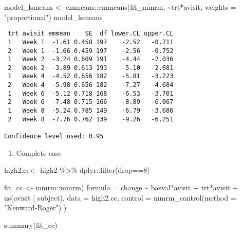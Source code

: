 \documentclass[
  letterpaper,
  DIV=11,
  numbers=noendperiod]{scrreprt}
\newenvironment{Shaded}{\begin{snugshade}}{\end{snugshade}}
\newcommand{\AttributeTok}[1]{\textcolor[rgb]{0.40,0.45,0.13}{#1}}
\newcommand{\DecValTok}[1]{\textcolor[rgb]{0.68,0.00,0.00}{#1}}
\newcommand{\FunctionTok}[1]{\textcolor[rgb]{0.28,0.35,0.67}{#1}}
\newcommand{\NormalTok}[1]{\textcolor[rgb]{0.00,0.23,0.31}{#1}}
\newcommand{\OtherTok}[1]{\textcolor[rgb]{0.00,0.23,0.31}{#1}}
\newcommand{\SpecialCharTok}[1]{\textcolor[rgb]{0.37,0.37,0.37}{#1}}
\newcommand{\StringTok}[1]{\textcolor[rgb]{0.13,0.47,0.30}{#1}}
\providecommand{\tightlist}{%
  \setlength{\itemsep}{0pt}\setlength{\parskip}{0pt}}\usepackage{longtable,booktabs,array}
\begin{document}
\begin{Shaded}
\begin{Highlighting}[]
\NormalTok{model\_lsmeans }\OtherTok{\textless{}{-}}\NormalTok{ emmeans}\SpecialCharTok{::}\FunctionTok{emmeans}\NormalTok{(fit\_mmrm, }\SpecialCharTok{\textasciitilde{}}\NormalTok{trt}\SpecialCharTok{*}\NormalTok{avisit, }\AttributeTok{weights =} \StringTok{"proportional"}\NormalTok{)}
\NormalTok{model\_lsmeans}
\end{Highlighting}
\end{Shaded}

\begin{verbatim}
 trt avisit emmean    SE  df lower.CL upper.CL
 1   Week 1  -1.61 0.458 197    -2.52   -0.711
 2   Week 1  -1.66 0.459 197    -2.56   -0.752
 1   Week 2  -3.24 0.609 191    -4.44   -2.036
 2   Week 2  -3.89 0.613 193    -5.10   -2.681
 1   Week 4  -4.52 0.656 182    -5.81   -3.223
 2   Week 4  -5.98 0.656 182    -7.27   -4.684
 1   Week 6  -5.12 0.718 168    -6.53   -3.701
 2   Week 6  -7.48 0.715 166    -8.89   -6.067
 1   Week 8  -5.24 0.785 149    -6.79   -3.686
 2   Week 8  -7.76 0.762 139    -9.26   -6.251

Confidence level used: 0.95 
\end{verbatim}

\begin{enumerate}
\def\labelenumi{\arabic{enumi}.}
\setcounter{enumi}{1}
\tightlist
\item
  Complete case
\end{enumerate}

\begin{Shaded}
\begin{Highlighting}[]
\NormalTok{high2.cc}\OtherTok{\textless{}{-}}\NormalTok{ high2 }\SpecialCharTok{\%\textgreater{}\%}\NormalTok{ dplyr}\SpecialCharTok{::}\FunctionTok{filter}\NormalTok{(drop}\SpecialCharTok{==}\DecValTok{8}\NormalTok{)}

\NormalTok{fit\_cc }\OtherTok{\textless{}{-}}\NormalTok{ mmrm}\SpecialCharTok{::}\FunctionTok{mmrm}\NormalTok{(}
  \AttributeTok{formula =}\NormalTok{ change }\SpecialCharTok{\textasciitilde{}}\NormalTok{ basval}\SpecialCharTok{*}\NormalTok{avisit }\SpecialCharTok{+}\NormalTok{ trt}\SpecialCharTok{*}\NormalTok{avisit }\SpecialCharTok{+} \FunctionTok{us}\NormalTok{(avisit }\SpecialCharTok{|}\NormalTok{ subject),}
  \AttributeTok{data =}\NormalTok{ high2.cc,}
  \AttributeTok{control =} \FunctionTok{mmrm\_control}\NormalTok{(}\AttributeTok{method =} \StringTok{"Kenward{-}Roger"}\NormalTok{)}
\NormalTok{)}

\FunctionTok{summary}\NormalTok{(fit\_cc)}
\end{Highlighting}
\end{Shaded}
\end{document}
